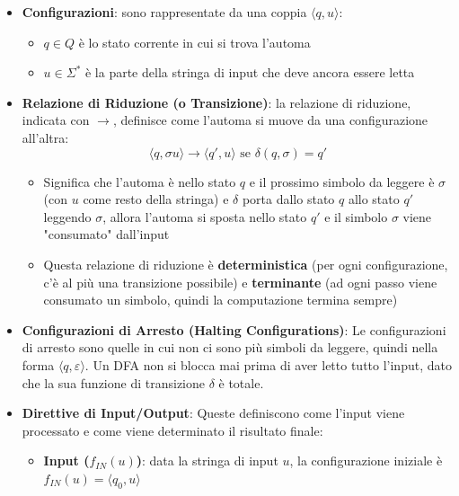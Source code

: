 \documentclass[12pt, a4paper]{report}
\begin{document}
                \begin{itemize}
                    \item \textbf{Configurazioni}: sono rappresentate da una coppia $\langle q,u \rangle$: \begin{itemize}
                        \item $q\in Q$ è lo stato corrente in cui si trova l'automa
                        \item $u\in\Sigma^*$ è la parte della stringa di input che deve ancora essere letta
                    \end{itemize}
                    \item \textbf{Relazione di Riduzione (o Transizione)}: la relazione di riduzione, indicata con $\to$, definisce come l'automa si muove da una configurazione all'altra: \begin{equation*}
                        \langle q,\sigma u\rangle\to\langle q',u\rangle \text{ se } \delta(q,\sigma)=q'
                    \end{equation*} \begin{itemize}
                        \item Significa che l'automa è nello stato $q$ e il prossimo simbolo da leggere è $\sigma$ (con $u$ come resto della stringa) e $\delta$ porta dallo stato $q$ allo stato $q'$ leggendo $\sigma$, allora l'automa si sposta nello stato $q'$ e il simbolo $\sigma$ viene "consumato" dall'input
                        \item Questa relazione di riduzione è \textbf{deterministica} (per ogni configurazione, c'è al più una transizione possibile) e \textbf{terminante} (ad ogni passo viene consumato un simbolo, quindi la computazione termina sempre)
                    \end{itemize}
                    \item \textbf{Configurazioni di Arresto (Halting Configurations)}: Le configurazioni di arresto sono quelle in cui non ci sono più simboli da leggere, quindi nella forma $\langle q,\varepsilon\rangle$. Un DFA non si blocca mai prima di aver letto tutto l'input, dato che la sua funzione di transizione $\delta$ è totale.
                    \item \textbf{Direttive di Input/Output}: Queste definiscono come l'input viene processato e come viene determinato il risultato finale: \begin{itemize}
                        \item \textbf{Input ($f_{IN}(u)$)}: data la stringa di input $u$, la configurazione iniziale è $f_{IN}(u)=\langle q_0, u\rangle$

\end{itemize}
\end{itemize}
\end{document}
